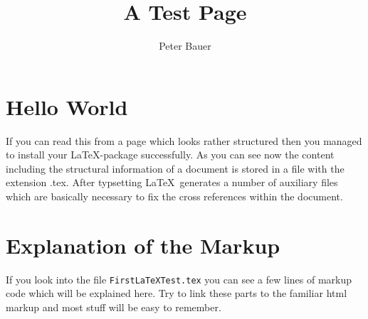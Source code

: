 \documentclass[11pt]{article}
\title{A Test Page}
\author{Peter Bauer}
\begin{document}
\maketitle
\section{Hello World}
If you can read this from a page which looks rather structured then you managed to install your \LaTeX-package successfully. As you can see now the content including the structural information of a document is stored in a file with the extension .tex. After typsetting \LaTeX\ generates a number of auxiliary files which are basically necessary to fix the cross references within the document.

\section{Explanation of the Markup}
If you look into the file \verb$FirstLaTeXTest.tex$ you can see a few lines of markup code which will be explained here. Try to link these parts to the familiar html markup and most stuff will be easy to remember.
\end{document}
